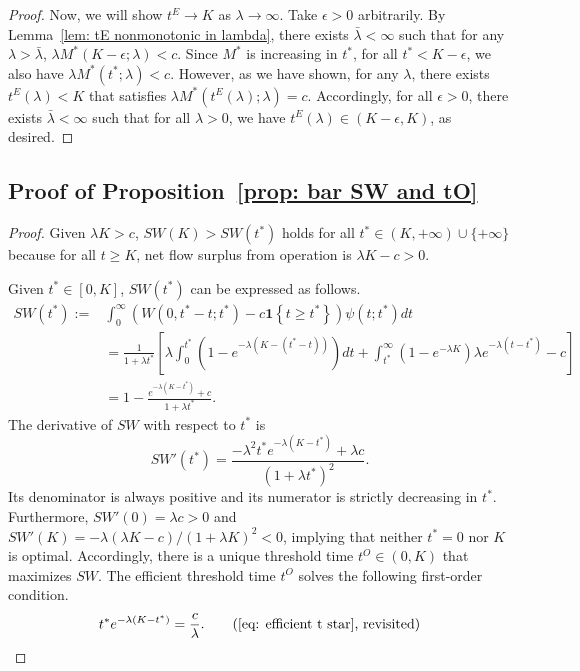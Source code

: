 \documentclass[12pt, letterpaper]{article}
\begin{document}
\begin{proof}
Now, we will show $t^E \to K$ as $\lambda \to \infty$. Take $\epsilon > 0$ arbitrarily. By Lemma~\ref{lem: tE nonmonotonic in lambda}, there exists $\bar{\lambda} <\infty$ such that for any $\lambda > \bar{\lambda}$, $\lambda M^*(K - \epsilon; \lambda) < c$. Since $M^*$ is increasing in $t^*$, for all $t^* < K - \epsilon$, we also have $\lambda M^*(t^*; \lambda) < c$. However, as we have shown, for any $\lambda$, there exists $t^E(\lambda) < K$ that satisfies $\lambda M^*(t^E(\lambda); \lambda) = c$. Accordingly, for all $\epsilon > 0$, there exists $\bar{\lambda} <\infty$ such that for all $\lambda > 0$, we have $t^E(\lambda) \in (K - \epsilon, K)$, as desired.
\end{proof} %










\subsection{Proof of Proposition~\ref{prop: bar SW and tO}}

\begin{proof}
Given $\lambda K > c$, $SW(K) > SW(t^*)$ holds for all $t^* \in (K, +\infty) \cup \{+\infty\}$ because for all $t \ge K$, net flow surplus from operation is $\lambda K - c > 0$.

Given $t^* \in [0, K]$, $SW(t^*)$ can be expressed as follows.
\begin{align}
    SW(t^*) := & \int_0^\infty (W(0, t^* - t; t^*) - c \textbf{1}\left\{t \ge t^*\right\}) \psi(t; t^*) dt\\
    & = \frac{1}{1 + \lambda t^*}\left[\lambda \int_0^{t^*}(1 - e^{-\lambda(K - (t^* - t))}) dt + \int_{t^*}^\infty (1 - e^{-\lambda K})\lambda e^{-\lambda (t - t^*)} - c \right] \\
    & =  1 - \frac{e^{- \lambda(K - t^*)} + c}{1 + \lambda t^*}.
\end{align}
The derivative of $SW$ with respect to $t^*$ is
\begin{equation}
    SW'(t^*) = \frac{- \lambda^2 t^* e^{-\lambda (K - t^*)} + \lambda c}{\left(1 + \lambda t^*\right)^2}.
\end{equation}
Its denominator is always positive and its numerator is strictly decreasing in $t^*$. Furthermore, $SW'(0) = \lambda c > 0$ and $SW'(K) = - \lambda (\lambda K - c)/(1 + \lambda K)^2 < 0$, implying that neither $t^* = 0$ nor $K$ is optimal. Accordingly, there is a unique threshold time $t^O \in (0, K)$ that maximizes $SW$. The efficient threshold time $t^O$ solves the following first-order condition.
\begin{equation}%
    t^* e^{-\lambda (K - t^*)} = \frac{c}{\lambda}.\tag{\ref{eq: efficient t star}, revisited}
\end{equation}
\end{proof}%
\end{document}
